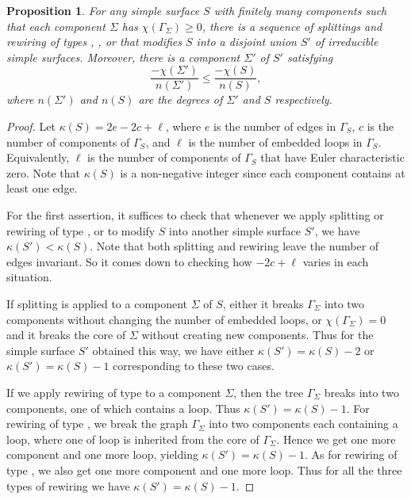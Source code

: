 \documentclass{amsart}
\newtheorem{proposition}[theorem]{Proposition}
\theoremstyle{definition}
\numberwithin{equation}{section}
\theoremstyle{theorem}
\theoremstyle{remark}
\newcommand{\RNum}[1]{\uppercase\expandafter{\romannumeral #1\relax}}
\begin{document}
	\begin{proposition}\label{prop: reduce}
		For any simple surface $S$ with finitely many components such that each component $\Sigma$ has $\chi(\Gamma_\Sigma)\ge0$, there is a sequence of splittings and rewiring of types \RNum{1}, \RNum{2}, or \RNum{3} that modifies $S$ into a disjoint union $S'$ of irreducible simple surfaces. Moreover, %
		there is a component $\Sigma'$ of $S'$ satisfying
		$$\frac{-\chi(\Sigma')}{n(\Sigma')}\le\frac{-\chi(S)}{n(S)},$$
		where $n(\Sigma')$ and $n(S)$ are the degrees of $\Sigma'$ and $S$ respectively.
	\end{proposition}
	\begin{proof}
		Let $\kappa(S)=2e-2c+\ell$, where $e$ is the number of edges in $\Gamma_S$, $c$ is the number of components of $\Gamma_S$, and $\ell$ is the number of embedded loops in $\Gamma_S$. Equivalently, $\ell$ is the number of components of $\Gamma_S$ that have Euler characteristic zero. Note that $\kappa(S)$ is a non-negative integer since each component contains at least one edge.
		
		For the first assertion, it suffices to check that whenever we apply splitting or rewiring of type \RNum{1}, \RNum{2} or \RNum{3} to modify $S$ into another simple surface $S'$, we have $\kappa(S')<\kappa(S)$.
		Note that both splitting and rewiring leave the number of edges invariant. So it comes down to checking how $-2c+\ell$ varies in each situation.
		
		If splitting is applied to a component $\Sigma$ of $S$, either it breaks $\Gamma_\Sigma$ into two components without changing the number of embedded loops, or $\chi(\Gamma_\Sigma)=0$ and it breaks the core of $\Sigma$ without creating new components. Thus for the simple surface $S'$ obtained this way, we have either $\kappa(S')=\kappa(S)-2$ or $\kappa(S')=\kappa(S)-1$ corresponding to these two cases.
		
		If we apply rewiring of type \RNum{1} to a component $\Sigma$, then the tree $\Gamma_\Sigma$ breaks into two components, one of which contains a loop. Thus $\kappa(S')=\kappa(S)-1$. For rewiring of type \RNum{2}, we break the graph $\Gamma_\Sigma$ into two components each containing a loop, where one of loop is inherited from the core of $\Gamma_\Sigma$. Hence we get one more component and one more loop, yielding $\kappa(S')=\kappa(S)-1$. As for rewiring of type \RNum{3}, we also get one more component and one more loop. Thus for all the three types of rewiring we have $\kappa(S')=\kappa(S)-1$.
		

\end{proof}
\end{document}
